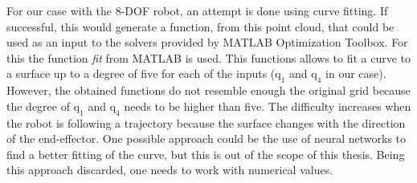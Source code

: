 %
%





For our case with the 8-DOF robot, an attempt is done using curve fitting. If successful, this would generate a function, from this point cloud, that could be used as an input to the solvers provided by MATLAB Optimization Toolbox. For this the function \textit{fit} from MATLAB is used. This functions allows to fit a curve to a surface up to a degree of five for each of the inputs ($\mathrm{q_1}$ and $\mathrm{q_4}$ in our case).  However, the obtained functions do not resemble enough the original grid because the degree of $\mathrm{q_1}$ and $\mathrm{q_4}$ needs to be higher than five. The difficulty increases when the robot is following a trajectory because the surface changes with the direction of the end-effector. One possible approach could be the use of neural networks to find a better fitting of the curve, but this is out of the scope of this thesis. Being this approach discarded, one needs to work with numerical values. 






